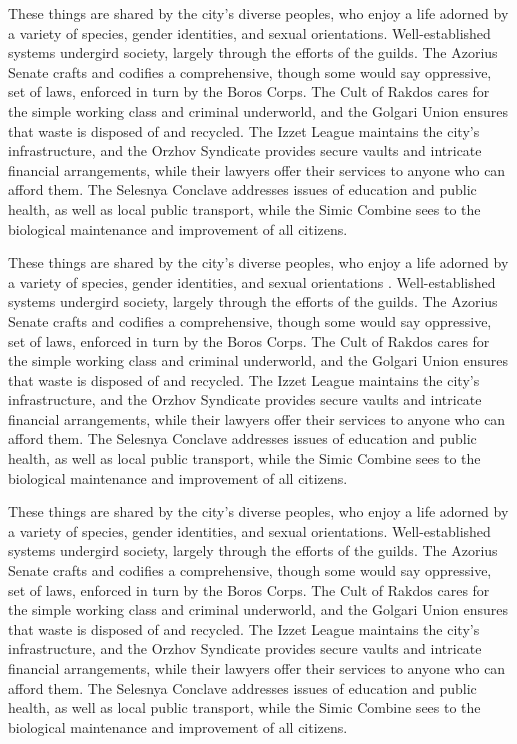 These things are shared by the city's diverse peoples, who enjoy a life adorned
by a variety of  species, gender identities, and sexual orientations.
Well-established systems undergird society, largely through the efforts of the
guilds. The Azorius Senate crafts and codifies a comprehensive, though some
would say oppressive, set of laws, enforced in turn by the Boros Corps. The Cult
of Rakdos cares for the simple working class and criminal underworld, and the
Golgari Union ensures that waste is disposed of and recycled. The Izzet League
maintains the city's infrastructure, and the Orzhov Syndicate provides secure
vaults and intricate financial arrangements, while their lawyers offer their
services to anyone who can afford them. The Selesnya Conclave addresses issues
of education and public health, as well as local public transport, while the
Simic Combine sees to the biological maintenance and improvement of all
citizens.

These things are shared by the city's diverse peoples, who enjoy a life adorned
by a variety of  species, gender identities, and sexual orientations
\citep{Trapnell2010, Scholz2003, Schweitzer2011}. Well-established systems undergird society, largely
through the efforts of the guilds. The Azorius Senate crafts and codifies a
comprehensive, though some would say oppressive, set of laws, enforced in turn
by the Boros Corps. The Cult of Rakdos cares for the simple working class and
criminal underworld, and the Golgari Union ensures that waste is disposed of and
recycled. The Izzet League maintains the city's infrastructure, and the Orzhov
Syndicate provides secure vaults and intricate financial arrangements, while
their lawyers offer their services to anyone who can afford them. The Selesnya
Conclave addresses issues of education and public health, as well as local
public transport, while the Simic Combine sees to the biological maintenance and
improvement of all citizens.

These things are shared by the city's diverse peoples, who enjoy a life adorned
by a variety of  species, gender identities, and sexual orientations.
Well-established systems undergird society, largely through the efforts of the
guilds. The Azorius Senate crafts and codifies a comprehensive, though some
would say oppressive, set of laws, enforced in turn by the Boros Corps. The Cult
of Rakdos cares for the simple working class and criminal underworld, and the
Golgari Union ensures that waste is disposed of and recycled. The Izzet League
maintains the city's infrastructure, and the Orzhov Syndicate provides secure
vaults and intricate financial arrangements, while their lawyers offer their
services to anyone who can afford them. The Selesnya Conclave addresses issues
of education and public health, as well as local public transport, while the
Simic Combine sees to the biological maintenance and improvement of all
citizens.

